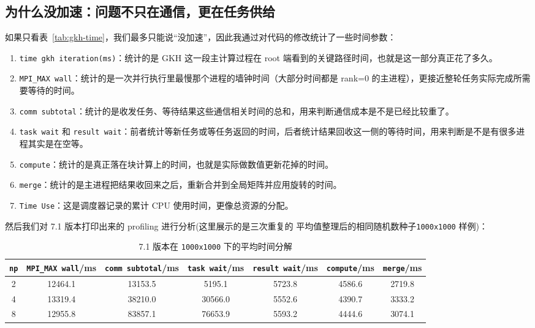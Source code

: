 \documentclass[12pt,a4paper,fontset=none]{ctexart}
\begin{document}
\subsection{为什么没加速：问题不只在通信，更在任务供给}

如果只看表~\ref{tab:gkh-time}，我们最多只能说“没加速”，因此我通过对代码的修改统计了一些时间参数：
\begin{enumerate}
    \item \texttt{time gkh iteration(ms)}：统计的是 GKH 这一段主计算过程在 root 端看到的关键路径时间，也就是这一部分真正花了多久。
    \item \texttt{MPI\_MAX wall}：统计的是一次并行执行里最慢那个进程的墙钟时间（大部分时间都是 rank=0 的主进程），更接近整轮任务实际完成所需要等待的时间。
    \item \texttt{comm subtotal}：统计的是收发任务、等待结果这些通信相关时间的总和，用来判断通信成本是不是已经比较重了。
    \item \texttt{task wait} 和 \texttt{result wait}：前者统计等新任务或等任务返回的时间，后者统计结果回收这一侧的等待时间，用来判断是不是有很多进程其实是在空等。
    \item \texttt{compute}：统计的是真正落在块计算上的时间，也就是实际做数值更新花掉的时间。
    \item \texttt{merge}：统计的是主进程把结果收回来之后，重新合并到全局矩阵并应用旋转的时间。
    \item \texttt{Time Use}：这是调度器记录的累计 CPU 使用时间，更像总资源的分配。
\end{enumerate}
\newpage
然后我们对 7.1 版本打印出来的 profiling 进行分析(这里展示的是三次重复的
平均值整理后的相同随机数种子\texttt{1000x1000} 样例)：

\begin{table}[h]
    \centering
    \scriptsize
    \caption{7.1 版本在 \texttt{1000x1000} 下的平均时间分解}
    \label{tab:profile-avg}
    \begin{tabular}{ccccccc}
        \toprule
        \texttt{np} & \texttt{MPI\_MAX wall}/ms & \texttt{comm subtotal}/ms &
        \texttt{task wait}/ms & \texttt{result wait}/ms & \texttt{compute}/ms & \texttt{merge}/ms \\
        \midrule
        2 & 12464.1 & 13153.5 & 5195.1  & 5723.8 & 4586.6 & 2719.8 \\
        4 & 13319.4 & 38210.0 & 30566.0 & 5552.6 & 4390.7 & 3333.2 \\
        8 & 12955.8 & 83857.1 & 76653.9 & 5593.2 & 4444.6 & 3074.1 \\
        \bottomrule
    \end{tabular}
\end{table}
\end{document}
